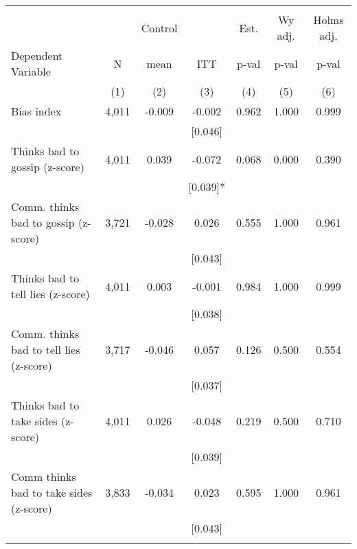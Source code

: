 \begin{tabular}{lcccccc}
\hline \noalign{\smallskip} &  &  &  &  &  & \\
 &  & Control &  & Est. & Wy adj. & Holms adj.\\
Dependent Variable & N & mean & ITT & p-val & p-val & p-val\\
 & (1) & (2) & (3) & (4) & (5) & (6)\\
\noalign{\smallskip}\hline \noalign{\smallskip}Bias index & 4,011 & -0.009 & -0.002 & 0.962 & 1.000 & 0.999\\
 &  &  & [0.046] &  &  & \\
\quad Thinks bad to gossip (z-score) & 4,011 & 0.039 & -0.072 & 0.068 & 0.000 & 0.390\\
 &  &  & [0.039]* &  &  & \\
\quad Comm. thinks bad to gossip (z-score) & 3,721 & -0.028 & 0.026 & 0.555 & 1.000 & 0.961\\
 &  &  & [0.043] &  &  & \\
\quad Thinks bad to tell lies (z-score) & 4,011 & 0.003 & -0.001 & 0.984 & 1.000 & 0.999\\
 &  &  & [0.038] &  &  & \\
\quad Comm. thinks bad to tell lies (z-score) & 3,717 & -0.046 & 0.057 & 0.126 & 0.500 & 0.554\\
 &  &  & [0.037] &  &  & \\
\quad Thinks bad to take sides (z-score) & 4,011 & 0.026 & -0.048 & 0.219 & 0.500 & 0.710\\
 &  &  & [0.039] &  &  & \\
\quad Comm thinks bad to take sides (z-score) & 3,833 & -0.034 & 0.023 & 0.595 & 1.000 & 0.961\\
 &  &  & [0.043] &  &  & \\
\noalign{\smallskip}\hline\end{tabular}

